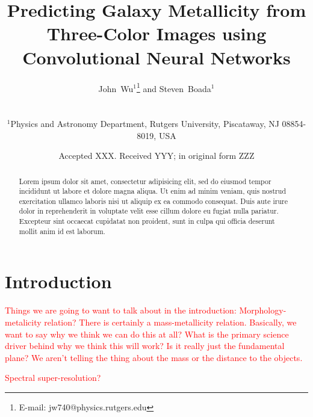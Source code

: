 \documentclass[fleqn,usenatbib]{mnras}
\title[Metallicity with CNNs]{Predicting Galaxy Metallicity from Three-Color Images using Convolutional Neural Networks}
\author[Wu and Boada]
{\parbox{\textwidth}{John~Wu$^{1}$\thanks{E-mail: jw740@physics.rutgers.edu} and
Steven~Boada$^{1}$}\vspace{0.4cm}\
\\
\parbox{\textwidth}{$^{1}$Physics and Astronomy Department, Rutgers University, Piscataway, NJ 08854-8019, USA\\}}
\date{Accepted XXX. Received YYY; in original form ZZZ}
\newcommand{\editorial}[1]{\textcolor{red}{#1}}
\begin{document}
\label{firstpage}
\pagerange{\pageref{firstpage}--\pageref{lastpage}}
\maketitle

\begin{abstract}
\noindent
Lorem ipsum dolor sit amet, consectetur adipisicing elit, sed do eiusmod tempor incididunt ut labore et dolore magna aliqua. Ut enim ad minim veniam, quis nostrud exercitation ullamco laboris nisi ut aliquip ex ea commodo consequat. Duis aute irure dolor in reprehenderit in voluptate velit esse cillum dolore eu fugiat nulla pariatur. Excepteur sint occaecat cupidatat non proident, sunt in culpa qui officia deserunt mollit anim id est laborum.
\end{abstract}

\section{Introduction}\label{sec:introduction}
\editorial{Things we are going to want to talk about in the introduction: Morphology-metalicity relation? There is certainly a mass-metallicity relation. Basically, we want to say why we think we can do this at all? What is the primary science driver behind why we think this will work? Is it really just the fundamental plane? We aren't telling the thing about the mass or the distance to the objects.}


\editorial{Spectral super-resolution?}
\end{document}
